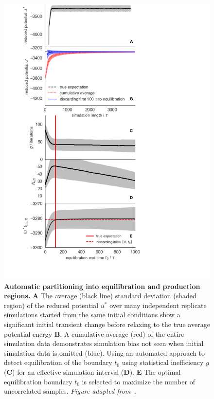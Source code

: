 \documentclass[9pt,bestpractices]{livecoms}
\begin{document}
\begin{figure}
    \centering
    \includegraphics[width=0.95\linewidth]{figures/fig11_equib_detection/Figure.pdf}
    \caption{{\bf Automatic partitioning into equilibration and production regions.}
    \textbf{A} The average (black line) standard deviation (shaded region) of the reduced potential $u^*$ over many independent replicate simulations started from the same initial conditions show a significant initial transient change before relaxing to the true average potential energy \textbf{B}. A cumulative average (red) of the entire simulation data demonstrates simulation bias not seen when initial simulation data is omitted (blue). Using an automated approach to detect equilibration of the boundary $t_0$ using statistical inefficiency $g$ (\textbf{C})  for an effective simulation interval (\textbf{D}). \textbf{E} The optimal equilibration boundary $t_0$ is selected to maximize the number of uncorrelated samples.
    \emph{Figure adapted from~\cite{chodera2016simple}.}
    }
    \label{fig:automatic-equilibration-detection}
\end{figure}
\end{document}
